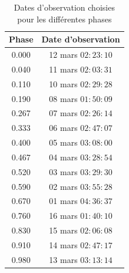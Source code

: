 \documentclass[10pt,french, openany]{book}
\begin{document}
        \begin{table}[H]
        
            \centering
                        
            \begin{tabular}{|c|c|}
                \toprule
                 Phase &      Date d’observation \\
                \midrule
                 0.000 &  12 mars $02{:}23{:}10$ \\
                 0.040 &  11 mars $02{:}03{:}31$ \\
                 0.110 &  10 mars $02{:}29{:}28$ \\
                 0.190 &  08 mars $01{:}50{:}09$ \\
                 0.267 &  07 mars $02{:}26{:}14$ \\
                 0.333 &  06 mars $02{:}47{:}07$ \\
                 0.400 &  05 mars $03{:}08{:}00$ \\
                 0.467 &  04 mars $03{:}28{:}54$ \\
                 0.520 &  03 mars $03{:}29{:}30$ \\
                 0.590 &  02 mars $03{:}55{:}28$ \\
                 0.670 &  01 mars $04{:}36{:}37$ \\
                 0.760 &  16 mars $01{:}40{:}10$ \\
                 0.830 &  15 mars $02{:}06{:}08$ \\
                 0.910 &  14 mars $02{:}47{:}17$ \\
                 0.980 &  13 mars $03{:}13{:}14$ \\
                \bottomrule
            \end{tabular}
            \caption{Dates d'observation choisies pour les différentes phases}
            \label{tab:dates_obs}
        \end{table} 
        
\end{document}
